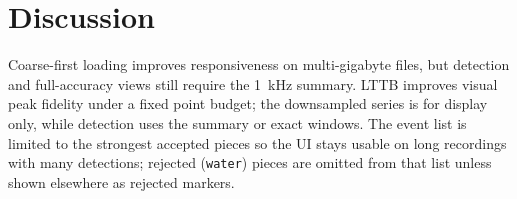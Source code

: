 
\section{Discussion}

Coarse-first loading improves responsiveness on multi-gigabyte files, but detection and
full-accuracy views still require the \SI{1}{\kilo\hertz} summary. LTTB improves visual peak
fidelity under a fixed point budget; the downsampled series is for display only, while
detection uses the summary or exact windows. The event list is limited to the strongest
accepted pieces so the UI stays usable on long recordings with many detections; rejected
(\texttt{water}) pieces are omitted from that list unless shown elsewhere as rejected
markers.
